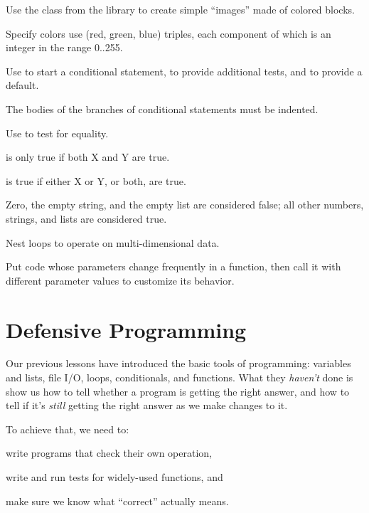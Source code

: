 \begin{keypoints}
\begin{swcitemize}
\item
  Use the  class from the 
  library to create simple ``images'' made of colored blocks.
\item
  Specify colors use (red, green, blue) triples, each component of which
  is an integer in the range 0..255.
\item
  Use  to start a conditional statement,
   to provide additional tests, and 
  to provide a default.
\item
  The bodies of the branches of conditional statements must be indented.
\item
  Use \code{==} to test for equality.
\item
   is only true if both X and Y are true.
\item
   is true if either X or Y, or both, are true.
\item
  Zero, the empty string, and the empty list are considered false; all
  other numbers, strings, and lists are considered true.
\item
  Nest loops to operate on multi-dimensional data.
\item
  Put code whose parameters change frequently in a function, then call
  it with different parameter values to customize its behavior.
\end{swcitemize}
\end{keypoints}

\section{Defensive Programming}

Our previous lessons have introduced the basic tools of programming:
variables and lists, file I/O, loops, conditionals, and functions. What
they \emph{haven't} done is show us how to tell whether a program is
getting the right answer, and how to tell if it's \emph{still} getting
the right answer as we make changes to it.

To achieve that, we need to:

\begin{swcitemize}
\item
  write programs that check their own operation,
\item
  write and run tests for widely-used functions, and
\item
  make sure we know what ``correct'' actually means.
\end{swcitemize}

